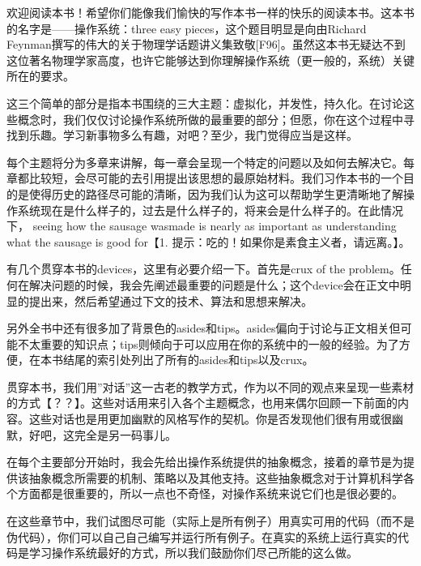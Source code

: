  \vspace*{0.0cm}
\thispagestyle{empty}
\centerline{}\vspace{2cm}

欢迎阅读本书！希望你们能像我们愉快的写作本书一样的快乐的阅读本书。这本书的名字是——操作系统：three easy pieces，这个题目明显是向由Richard Feynman撰写的伟大的关于物理学话题讲义集致敬[F96]。虽然这本书无疑达不到这位著名物理学家高度，也许它能够达到你理解操作系统（更一般的，系统）关键所在的要求。

这三个简单的部分是指本书围绕的三大主题：虚拟化，并发性，持久化。在讨论这些概念时，我们仅仅讨论操作系统所做的最重要的部分；但愿，你在这个过程中寻找到乐趣。学习新事物多么有趣，对吧？至少，我门觉得应当是这样。

每个主题将分为多章来讲解，每一章会呈现一个特定的问题以及如何去解决它。每章都比较短，会尽可能的去引用提出该思想的最原始材料。我们习作本书的一个目的是使得历史的路径尽可能的清晰，因为我们认为这可以帮助学生更清晰地了解操作系统现在是什么样子的，过去是什么样子的，将来会是什么样子的。在此情况下， seeing how the sausage wasmade is nearly
as important as understanding what the sausage is good for【1. 提示：吃的！如果你是素食主义者，请远离。】。

有几个贯穿本书的devices，这里有必要介绍一下。首先是crux of the problem。任何在解决问题的时候，我会先阐述最重要的问题是什么；这个device会在正文中明显的提出来，然后希望通过下文的技术、算法和思想来解决。

另外全书中还有很多加了背景色的asides和tips。asides偏向于讨论与正文相关但可能不太重要的知识点；tips则倾向于可以应用在你的系统中的一般的经验。为了方便，在本书结尾的索引处列出了所有的asides和tips以及crux。

贯穿本书，我们用”对话”这一古老的教学方式，作为以不同的观点来呈现一些素材的方式【？？】。这些对话用来引入各个主题概念，也用来偶尔回顾一下前面的内容。这些对话也是用更加幽默的风格写作的契机。你是否发现他们很有用或很幽默，好吧，这完全是另一码事儿。

在每个主要部分开始时，我会先给出操作系统提供的抽象概念，接着的章节是为提供该抽象概念所需要的机制、策略以及其他支持。这些抽象概念对于计算机科学各个方面都是很重要的，所以一点也不奇怪，对操作系统来说它们也是很必要的。

在这些章节中，我们试图尽可能（实际上是所有例子）用真实可用的代码（而不是伪代码），你们可以自己自己编写并运行所有例子。在真实的系统上运行真实的代码是学习操作系统最好的方式，所以我们鼓励你们尽己所能的这么做。

